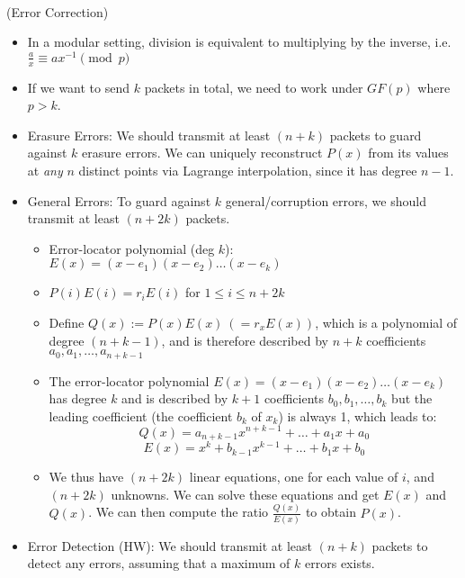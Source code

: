 \documentclass{article}
\begin{document}
\\
(Error Correction)
\begin{itemize}
	\item In a modular setting, division is equivalent to multiplying by the inverse, i.e. $\frac{a}{x} \equiv ax^{-1}\pmod{p}$
	\item If we want to send $k$ packets in total, we need to work under $GF(p)$ where $p>k$.
	\item Erasure Errors: We should transmit at least $(n+k)$ packets to guard against $k$ erasure errors. We can uniquely reconstruct $P(x)$ from its values at \textit{any} $n$ distinct points via Lagrange interpolation, since it has degree $n-1$.
	\item General Errors: To guard against $k$ general/corruption errors, we should transmit at least $(n+2k)$ packets.
	\begin{itemize}
		\item Error-locator polynomial (deg $k$): $E(x) = (x-e_1)(x-e_2)\dots(x-e_k)$
		\item {\color{red} $P(i)E(i) = r_iE(i)$ for $1\leq i\leq n+2k$}
		\item Define $Q(x) := P(x)E(x)\ (= r_xE(x))$, which is a polynomial of degree $(n+k-1)$, and is therefore described by $n+k$ coefficients $a_0,a_1,\dots,a_{n+k-1}$
		\item The error-locator polynomial $E(x) = (x-e_1)(x-e_2)\dots(x-e_k)$ has degree $k$ and is described by $k+1$ coefficients $b_0,b_1,\dots,b_k$ but the leading coefficient (the coefficient $b_k$ of $x_k$) is always 1, which leads to:
		$$Q(x) = a_{n+k-1}x^{n+k-1} +\dots+a_1x+a_0$$
		$$E(x) = x^k +b_{k-1}x^{k-1} +\dots+b_1x+b_0$$
		\item We thus have $(n+2k)$ linear equations, one for each value of $i$, and $(n+2k)$ unknowns. We can solve these equations and get $E(x)$ and $Q(x)$. We can then compute the ratio $\frac{Q(x)}{E(x)}$ to obtain $P(x)$.
	\end{itemize}
	\item Error Detection (HW): We should transmit at least $(n+k)$ packets to detect any errors, assuming that a maximum of $k$ errors exists.
\end{itemize}
\end{document}
